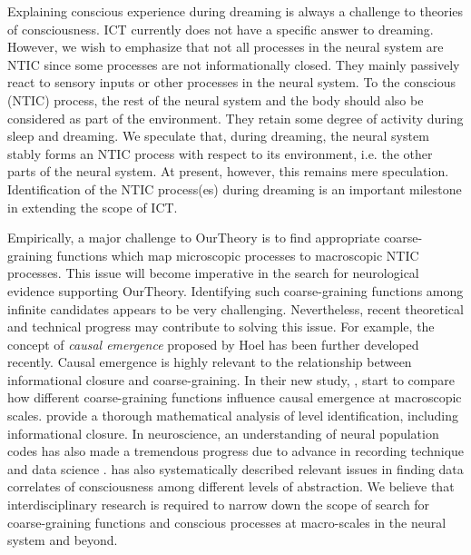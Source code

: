 \documentclass[utf8]{article}
\begin{document}
        Explaining conscious experience during dreaming is always a challenge to theories of consciousness. ICT currently does not have a specific answer to dreaming. However, we wish to emphasize that not all processes in the neural system are NTIC since some processes are not informationally closed. They mainly passively react to sensory inputs or other processes in the neural system. To the conscious (NTIC) process, the rest of the neural system and the body should also be considered as part of the environment. They retain some degree of activity during sleep and dreaming. We speculate that, during dreaming, the neural system stably forms an NTIC process with respect to its environment, i.e. the other parts of the neural system. At present, however, this remains mere speculation. Identification of the NTIC process(es) during dreaming is an important milestone in extending the scope of ICT.
        
        Empirically, a major challenge to \ac{OurTheory} is to find appropriate coarse-graining functions which map microscopic processes to macroscopic NTIC processes. This issue will become imperative in the search for neurological evidence supporting \ac{OurTheory}. Identifying such coarse-graining functions among infinite candidates \citep{price2007causation} appears to be very challenging. Nevertheless, recent theoretical and technical progress may contribute to  solving this issue. For example, the concept of \textit{causal emergence} proposed by Hoel \citep{Hoel19790, Hoel2018} has been further developed recently. Causal emergence is highly relevant to the relationship between informational closure and coarse-graining. In their new study, \cite{klein2019uncertainty}, start to compare how different coarse-graining functions influence causal emergence at macroscopic scales. \cite{PFANTE.2014, PFANTE.2014b} provide a thorough mathematical analysis of level identification, including informational closure. In neuroscience, an understanding of neural population codes has also made a tremendous progress due to advance in recording technique and data science \citep{Kohn2016, panzeri2015neural}. \cite{Gamez2016} has also systematically described relevant issues in finding data correlates of consciousness among different levels of abstraction. We believe that interdisciplinary research is required to narrow down the scope of search for coarse-graining functions and conscious processes at macro-scales in the neural system and beyond.
        
\end{document}
